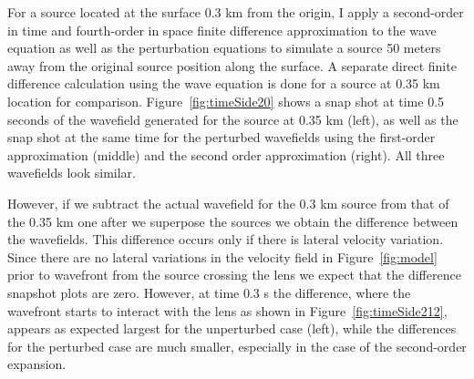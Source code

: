 For a source located at the surface 0.3 km from the origin, I apply a second-order in time and 
fourth-order in space finite difference approximation to the wave equation as well as the perturbation equations
to simulate a source 50 meters away from the original source position along the surface. A separate direct finite difference calculation using the wave equation is
done for a source at 0.35 km location for comparison. Figure~\ref{fig:timeSide20} shows a snap shot at time 0.5 seconds of the wavefield 
generated for the source at 0.35 km (left), as well as
the snap shot at the same time for the perturbed wavefields using the first-order approximation (middle) and the second order approximation (right). All
three wavefields look similar. 

However, if we subtract the actual wavefield for the 0.3 km source from that of the 0.35 km one after we superpose the
sources we obtain the 
difference between the wavefields. This difference occurs only if there is lateral velocity variation. Since there are
no lateral variations in the velocity field in Figure~\ref{fig:model} prior to wavefront from the source 
crossing the lens
we expect that the difference snapshot plots are zero.
However,
at time 0.3 s the difference, where the wavefront starts to interact with the lens as shown in Figure~\ref{fig:timeSide212},
 appears as expected largest for the unperturbed case (left), while
the differences for the perturbed case are much smaller, especially in the case of the second-order expansion. 

